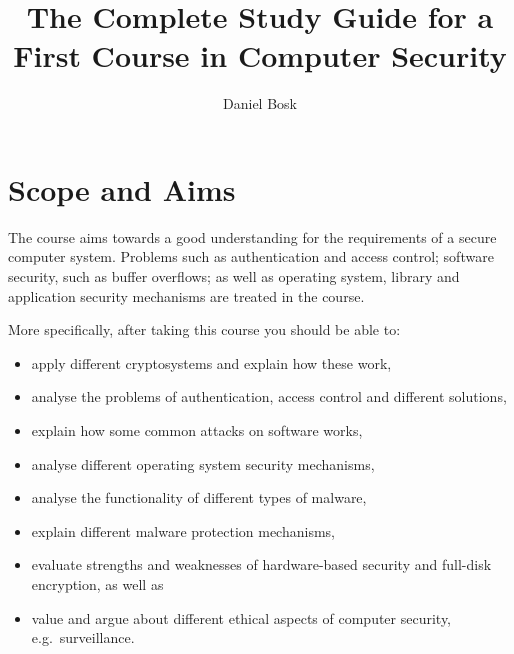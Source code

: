 \title{%
  The Complete Study Guide for a First Course in
  Computer Security
}
\author{%
  Daniel Bosk
}

\maketitle


\section{Scope and Aims}
\label{sec:aim}
The course aims towards a good understanding for the requirements of a secure 
computer system.
Problems such as authentication and access control; software security, such as 
buffer overflows; as well as operating system, library and application security 
mechanisms are treated in the course.

More specifically, after taking this course you should be able to:
\begin{itemize}
%  
%  
%  
%  
%  
%  
%  
%  
  \item apply different cryptosystems and explain how these work,
  \item analyse the problems of authentication, access control and different 
  solutions,
  \item explain how some common attacks on software works,
  \item analyse different operating system security mechanisms,
  \item analyse the functionality of different types of malware,
  \item explain different malware protection mechanisms,
  \item evaluate strengths and weaknesses of hardware-based security and 
    full-disk encryption, as well as
  \item value and argue about different ethical aspects of computer security, 
    e.g.\ surveillance.
\end{itemize}


